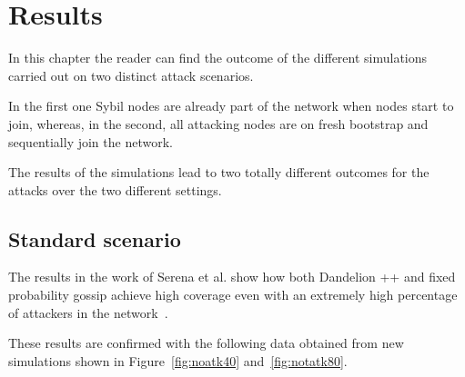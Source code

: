 \chapter{Results}
\label{sec:res}
In this chapter the reader can find the outcome of the different simulations carried out on two distinct attack scenarios.

In the first one Sybil nodes are already part of the network when nodes start to join, whereas, in the second, all attacking nodes are on fresh bootstrap and sequentially join the network.

The results of the simulations lead to two totally different outcomes for the attacks over the two different settings.

\section{Standard scenario}
The results in the work of Serena et al. show how both Dandelion ++ and fixed probability gossip achieve high coverage even with an extremely high percentage of attackers in the network~\cite{lunes-dissemination}.

These results are confirmed with the following data obtained from new simulations shown in Figure~\ref{fig:noatk40} and~\ref{fig:notatk80}.\par

